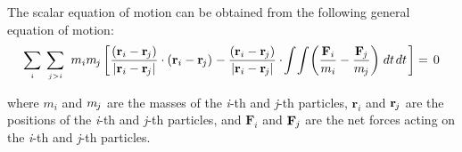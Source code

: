 \documentclass[10pt]{article}
\newcommand{\mM}{m}
\newcommand{\ri}{_i}
\newcommand{\vR}{\mathbf{r}}
\newcommand{\vF}{\mathbf{F}}
\newcommand{\rj}{_{\hspace{-0.081em}j}}
\begin{document}
\vspace{+1.20em}

\par The scalar equation of motion can be obtained from the following general equation of motion:
{\fontsize{6}{6}\selectfont\begin{eqnarray*}
\sum_{\scriptscriptstyle i} \hspace{+0.24em} \sum_{\scriptscriptstyle j>i} \hspace{+0.36em} \mM\ri\mM\rj \left[ \hspace{+0.03em} \frac{(\vR\ri - \vR\rj)}{|\vR\ri - \vR\rj|} \cdot (\vR\ri - \vR\rj) \hspace{+0.06em} - \frac{(\vR\ri - \vR\rj)}{|\vR\ri - \vR\rj|} \cdot \hspace{-0.12em} \int \hspace{-0.12em} \int \hspace{-0.12em} \left(\frac{\vF\ri}{\mM\ri} - \frac{\vF\rj}{\mM\rj}\right) \hspace{+0.12em} dt \hspace{+0.12em} dt \hspace{+0.12em} \right] = \hspace{+0.15em} 0
\end{eqnarray*}}
\vspace{-0.90em}
\par \noindent where $\mM\ri$ and $\mM\rj$ are the masses of the \textit{i}-th and \textit{j}-th particles, $\vR\ri$ and $\vR\rj$ are the positions of the \textit{i}-th and \textit{j}-th particles, and $\vF\ri$ and $\vF\rj$ are the net forces acting on the \textit{i}-th and \textit{j}-th particles.
\end{document}
